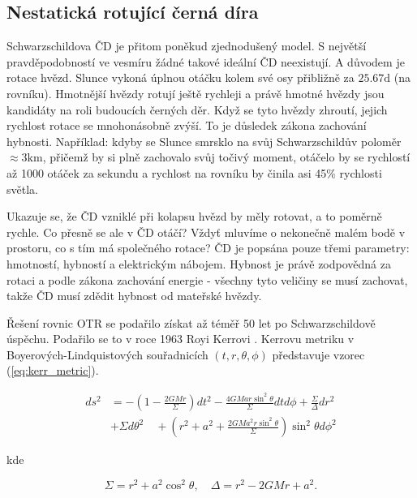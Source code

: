 \documentclass[
	a4paper, %
	10pt, %
	unnumberedsections, %
	twoside, %
]{LTJournalArticle}
\begin{document}
\subsection{Nestatická rotující černá díra}

Schwarzschildova ČD je přitom poněkud zjednodušený model. S největší pravděpodobností ve vesmíru žádné takové ideální ČD neexistují. A důvodem je rotace hvězd. Slunce vykoná úplnou otáčku kolem své osy přibližně za $25.67 \text{d}$ (na rovníku). Hmotnější hvězdy rotují ještě rychleji a právě hmotné hvězdy jsou kandidáty na roli budoucích černých děr. Když se tyto hvězdy zhroutí, jejich rychlost rotace se mnohonásobně zvýší. To je důsledek zákona zachování hybnosti. Například: kdyby se Slunce smrsklo na svůj Schwarzschildův poloměr $\approx 3 \text{km}$, přičemž by si plně zachovalo svůj točivý moment, otáčelo by se rychlostí až 1000 otáček za sekundu a rychlost na rovníku by činila asi 45\% rychlosti světla.  

Ukazuje se, že ČD vzniklé při kolapsu hvězd by měly rotovat, a to poměrně rychle. Co přesně se ale v ČD otáčí? Vždyť mluvíme o nekonečně malém bodě v prostoru, co s tím má společného rotace? ČD je popsána pouze třemi parametry: hmotností, hybností a elektrickým nábojem. Hybnost je právě zodpovědná za rotaci a podle zákona zachování energie - všechny tyto veličiny se musí zachovat, takže ČD musí zdědit hybnost od mateřské hvězdy. 

Řešení rovnic OTR se podařilo získat až téměř 50 let po Schwarzschildově úspěchu. Podařilo se to v roce 1963 Royi Kerrovi \autocite{kerr1963}. Kerrovu metriku v Boyerových-Lindquistových souřadnicích $(t, r, \theta, \phi)$ představuje vzorec (\ref{eq:kerr_metric}).

\begin{equation}
	\begin{split}
		ds^2 &= -\left( 1 - \frac{2GM r}{\Sigma} \right) dt^2 
		- \frac{4GM a r \sin^2\theta}{\Sigma} dt d\phi 
		+ \frac{\Sigma}{\Delta} dr^2 \\
		&+ \Sigma d\theta^2 \quad + \left( r^2 + a^2 + \frac{2GM a^2 r \sin^2\theta}{\Sigma} \right) \sin^2\theta d\phi^2
	\end{split}
	\label{eq:kerr_metric}
\end{equation}

kde

\begin{equation*}
	\Sigma = r^2 + a^2 \cos^2\theta, \quad
	\Delta = r^2 - 2GM r + a^2.
\end{equation*}
\end{document}
